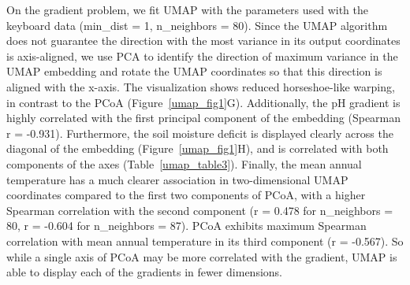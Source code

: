 On the gradient problem, we fit UMAP with the parameters used with the keyboard data (min\_dist = 1, n\_neighbors = 80). Since the UMAP algorithm does not guarantee the direction with the most variance in its output coordinates is axis-aligned, we use PCA to identify the direction of maximum variance in the UMAP embedding and rotate the UMAP coordinates so that this direction is aligned with the x-axis. The visualization shows reduced horseshoe-like warping, in contrast to the PCoA (Figure~\ref{umap_fig1}G). Additionally, the pH gradient is highly correlated with the first principal component of the embedding (Spearman r = -0.931). Furthermore, the soil moisture deficit is displayed clearly across the diagonal of the embedding (Figure~\ref{umap_fig1}H), and is correlated with both components of the axes (Table~\ref{umap_table3}). Finally, the mean annual temperature has a much clearer association in two-dimensional UMAP coordinates compared to the first two components of PCoA, with a higher Spearman correlation with the second component (r = 0.478 for n\_neighbors = 80, r = -0.604 for n\_neighbors = 87). PCoA exhibits maximum Spearman correlation with mean annual temperature in its third component (r = -0.567). So while a single axis of PCoA may be more correlated with the gradient, UMAP is able to display each of the gradients in fewer dimensions.


